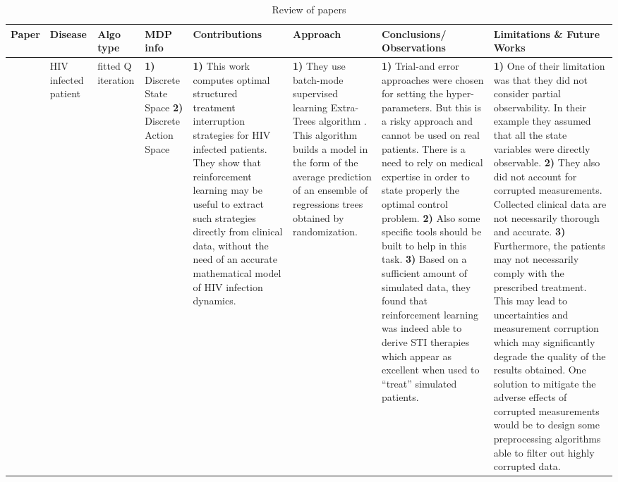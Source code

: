 \begin{table}[!th]
\caption{Review of papers}
\label{tab:review11}
\begin{tabular}{|p{3 em}|p{3 em}|p{3 em}|p{3em}|p{6em}|p{6em}|p{6 em}|p{9em}|}
\toprule
Paper  & Disease  & Algo type & MDP info & Contributions  & Approach & Conclusions/ Observations  & Limitations \& Future Works \\
\hline
\citet{ernst2006clinical} & HIV infected patient
& 
fitted Q iteration
& 
\textbf{1)} Discrete State Space 
\textbf{2)} Discrete Action Space 
&  
\textbf{1)} This work computes optimal structured treatment interruption strategies for HIV infected patients. They show that reinforcement learning may be useful to extract such strategies directly from clinical data, without the need of an accurate mathematical model of HIV
infection dynamics. 
&
\textbf{1)} They use batch-mode supervised learning Extra-Trees algorithm \citep{geurts2006extremely}. This algorithm builds a model in the form of the average
prediction of an ensemble of regressions trees obtained by
randomization. 
& 
\textbf{1)} Trial-and error approaches were chosen for setting the hyper-parameters. But this is a risky approach and cannot be used on real patients. There is a need to rely on medical expertise in order
to state properly the optimal control problem. \textbf{2)} Also some specific tools should be built to help in this task. \textbf{3)} Based on a sufficient amount of simulated data, they found that reinforcement learning was indeed able to derive STI therapies which appear as excellent when used to “treat” simulated patients.
& 
\textbf{1)} One of their limitation was that they did not consider partial observability. In their example they assumed that all the state variables were directly observable. \textbf{2)} They also did not account for corrupted measurements. Collected clinical data are not
necessarily thorough and accurate. \textbf{3)} Furthermore, the patients
may not necessarily comply with the prescribed treatment.
This may lead to uncertainties and measurement corruption
which may significantly degrade the quality of the results
obtained. One solution to mitigate the adverse effects of corrupted
measurements would be to design some preprocessing
algorithms able to filter out highly corrupted data.
   \\\midrule
\end{tabular}
\vspace*{-2em}
\end{table}   

